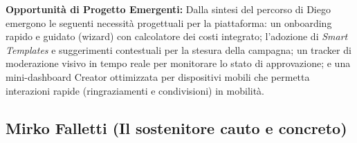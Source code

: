 \documentclass[11pt,a4paper]{article}
\begin{document}
    \vspace{0.3cm}
    \noindent\textbf{Opportunità di Progetto Emergenti:} Dalla sintesi del percorso di Diego emergono le seguenti necessità progettuali per la piattaforma: un onboarding rapido e guidato (wizard) con calcolatore dei costi integrato; l'adozione di \textit{Smart Templates} e suggerimenti contestuali per la stesura della campagna; un tracker di moderazione visivo in tempo reale per monitorare lo stato di approvazione; e una mini-dashboard Creator ottimizzata per dispositivi mobili che permetta interazioni rapide (ringraziamenti e condivisioni) in mobilità.


    \subsection{Mirko Falletti (Il sostenitore cauto e concreto)}
    \label{subsec:uj2}
\end{document}
